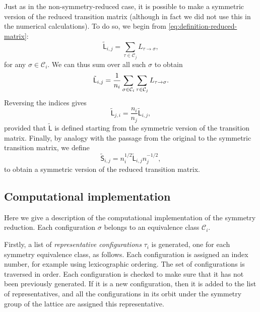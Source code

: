 \documentclass[10pt]{article}
\newcommand{\LL}{\mathsf{L}}
\renewcommand{\SS}{\mathsf{S}}
\newcommand{\tL}{\tilde{\LL}}
\newcommand{\tS}{\tilde{\SS}}
\renewcommand{\L}[2]{L_{#2 \to #1}}  %
\newcommand{\size}[1]{\left| #1 \right|}
\newcommand{\class}{\mathcal{C}}
\newcommand{\comment}[1]{{\color{red}#1}}
\begin{document}
Just as in the non-symmetry-reduced case, it is possible to make a symmetric
version of the reduced transition matrix (although in fact we did not use this
in the numerical calculations).
To do so, we begin from  \eqref{eq:definition-reduced-matrix}:
\begin{equation}
\tL_{i,j} = \sum_{\tau \in \class_j} \L{\sigma}{\tau},
\end{equation}
for any $\sigma \in \class_i$.  We can thus sum over all such $\sigma$ to
obtain
\begin{equation}
\tL_{i,j} = \frac{1}{
n_i} \sum_{\sigma \in \class_i} \sum_{\tau \in
\class_j} \L{\sigma}{\tau}.
\end{equation}
Reversing the indices gives
\begin{equation}
\tL_{j,i} = \frac{n_i}{n_j} \tL_{i,j},
\end{equation}
provided that $\tL$ is defined starting from the symmetric version of the
transition
matrix.
Finally, by analogy with the passage from the original to the symmetric
transition matrix, we define
\begin{equation}
\tS_{i,j} = n_i^{1/2} \tL_{i,j} n_j^{-1/2},
\end{equation}
to obtain a symmetric version of the
reduced
transition matrix.





 
\subsection{Computational implementation}
Here we give a description of the computational implementation of the symmetry
reduction. Each configuration $\sigma$ belongs to an equivalence class
$\class_i$. 

Firstly, a list of \emph{representative configurations} $\tau_i$ is
generated, one for each symmetry equivalence class, as follows.
Each configuration is assigned an index number, for example using lexicographic
ordering.
The set of configurations is traversed in order.  Each configuration is checked
to make
sure that it has not been previously generated.
If it is a new configuration, then it is added to the list of representatives,
and all the configurations in its orbit under the symmetry group of the
lattice are assigned this representative.
\end{document}

